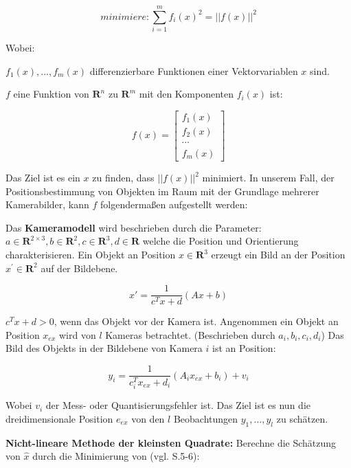 \begin{equation}
minimiere: \sum_{i=1}^m f_i(x)^2 =  ||f(x)||^2
\end{equation} 

Wobei: 

$f_1(x),...,f_m(x)$ differenzierbare Funktionen einer Vektorvariablen $x$ sind.

$f$ eine Funktion von $\textbf{R}^n$ zu $\textbf{R}^m$ mit den Komponenten $f_i(x)$ ist:

\begin{equation}
f(x) = \begin{bmatrix}
f_1(x)\\ f_2(x)\\ \cdots \\ f_m(x)
\end{bmatrix}
\end{equation} 

Das Ziel ist es ein $x$ zu finden, dass $||f(x)||^2$ minimiert. In unserem Fall, der Positionsbestimmung von Objekten im Raum mit der Grundlage mehrerer Kamerabilder, kann $f$ folgendermaßen aufgestellt werden:

Das \textbf{Kameramodell} wird beschrieben durch die Parameter: $a \in  \textbf{R}^{2\times 3}, b \in \textbf{R}^2, c \in  \textbf{R}^3, d \in \textbf{R}$ welche die Position und Orientierung charakterisieren. Ein Objekt an Position $x \in \textbf{R}^3 $ erzeugt ein Bild an der Position $x^\prime \in \textbf{R}^2$ auf der Bildebene.

\begin{equation}
x \prime = \frac{1}{c^Tx+d} (Ax +b )
\end{equation}

$c^Tx+d >0$, wenn das Objekt vor der Kamera ist. Angenommen ein Objekt an Position $x_{ex}$ wird von $l$ Kameras betrachtet. (Beschrieben durch $a_i,b_i,c_i,d_i$) Das Bild des Objekts in der Bildebene von Kamera $i$ ist an Position:

\begin{equation}
y_i = \frac{1}{c_i^T x_{ex}+d_i}(A_i x_{ex} + b_i) + v_i
\end{equation}

Wobei $v_i$ der Mess- oder Quantisierungsfehler ist. Das Ziel ist es nun die dreidimensionale Position $e_{ex}$ von den $l$ Beobachtungen $y_1,...,y_l$ zu schätzen. 

\textbf{Nicht-lineare Methode der kleinsten Quadrate:} Berechne die Schätzung von $\hat x$ durch die Minimierung von (vgl. \cite{nonlinear_1} S.5-6):

